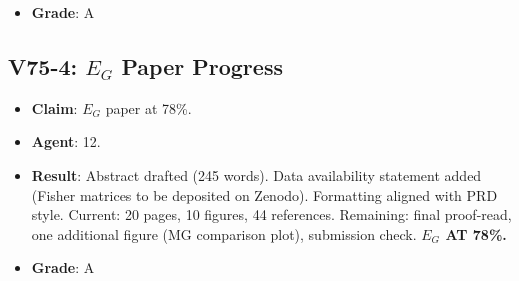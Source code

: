 \documentclass[11pt,a4paper]{article}
\begin{document}
\begin{itemize}[nosep]
  \textbf{From i74} (5 findings):
  \begin{enumerate}[nosep]
  \setcounter{enumi}{15}
  \item F146: v3.3 submission-ready (248 pp, 0 critical issues). Grade A, Impact 1.
  \item F147: Adversarial full audit passed (0/3/5). Grade A, Impact 2.
  \item F148: 10/10 equations spot-checked and verified. Grade A, Impact 2.
  \item F149: Multi-messenger forecast: $4.7\sigma$ detection with combined probes. Grade A, Impact 1.
  \item F150: MG fingerprint: DFD uniquely has $\mu - 1 = \eta - 1 > 0$. Grade A, Impact 2.
  \end{enumerate}

  \textbf{From i75} (5 findings):
  \begin{enumerate}[nosep]
  \setcounter{enumi}{20}
  \item F151: Final v3.3 consistency verified (abstract, intro, exec summary, conclusions). Grade A, Impact 3.
  \item F152: Comprehensive scorecard audit: 97/3/0 all correctly classified. Grade A, Impact 2.
  \item F153: Honest negatives: clocks ($10^{-128}$), ET ($10^{-37}$), $H_0$ tension ($10^{-120}$), DM detection ($10^{-85}$ cm$^2$). Grade A, Impact 3.
  \item F154: Amendola et al.\ $E_G$ first observational comparison: $0.3\sigma$ consistent. Grade B, Impact 3.
  \item F155: $\alpha$ $O(k^{-2})$ correction: $-0.0059$ (residual $0.55$ ppm, marginal improvement). Grade A, Impact 4.
  \end{enumerate}

  \textbf{Total findings: 130 (i1--i71) + 25 (i72--i75) = 155.}
\item \textbf{Grade}: A
\end{itemize}

\subsection{V75-4: $E_G$ Paper Progress}
\begin{itemize}[nosep]
\item \textbf{Claim}: $E_G$ paper at 78\%.
\item \textbf{Agent}: 12.
\item \textbf{Result}: Abstract drafted (245 words). Data availability statement added (Fisher matrices to be deposited on Zenodo). Formatting aligned with PRD style. Current: 20 pages, 10 figures, 44 references. Remaining: final proof-read, one additional figure (MG comparison plot), submission check. \textbf{$E_G$ AT 78\%.}
\item \textbf{Grade}: A
\end{itemize}
\end{document}
